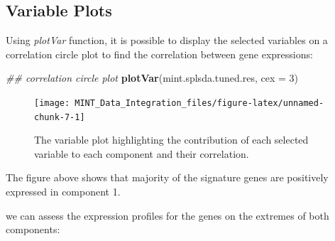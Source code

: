 \documentclass[]{book}
\newenvironment{Shaded}{\begin{snugshade}}{\end{snugshade}}
\newcommand{\CommentTok}[1]{\textcolor[rgb]{0.56,0.35,0.01}{\textit{#1}}}
\newcommand{\DataTypeTok}[1]{\textcolor[rgb]{0.13,0.29,0.53}{#1}}
\newcommand{\DecValTok}[1]{\textcolor[rgb]{0.00,0.00,0.81}{#1}}
\newcommand{\KeywordTok}[1]{\textcolor[rgb]{0.13,0.29,0.53}{\textbf{#1}}}
\newcommand{\NormalTok}[1]{#1}
\newcommand{\OperatorTok}[1]{\textcolor[rgb]{0.81,0.36,0.00}{\textbf{#1}}}
\newcommand{\StringTok}[1]{\textcolor[rgb]{0.31,0.60,0.02}{#1}}
\theoremstyle{definition}
\theoremstyle{definition}
\theoremstyle{definition}
\theoremstyle{remark}
\begin{document}
\hypertarget{variable-plots}{%
\subsection{Variable Plots}\label{variable-plots}}

Using \emph{plotVar} function, it is possible to display the selected
variables on a correlation circle plot to find the correlation between
gene expressions:

\begin{Shaded}
\begin{Highlighting}[]
\CommentTok{## correlation circle plot}
\KeywordTok{plotVar}\NormalTok{(mint.splsda.tuned.res, }\DataTypeTok{cex =} \DecValTok{3}\NormalTok{)}
\end{Highlighting}
\end{Shaded}

\begin{figure}[ht]

{\centering \texttt{[image: MINT\_Data\_Integration\_files/figure-latex/unnamed-chunk-7-1]} 

}

\caption{The variable plot highlighting the contribution of each selected variable to each component and their correlation.}\label{fig:unnamed-chunk-7}
\end{figure}

The figure above shows that majority of the signature genes are
positively expressed in component 1.

we can assess the expression profiles for the genes on the extremes of
both components:

\begin{Shaded}
\end{Shaded}
\end{document}
